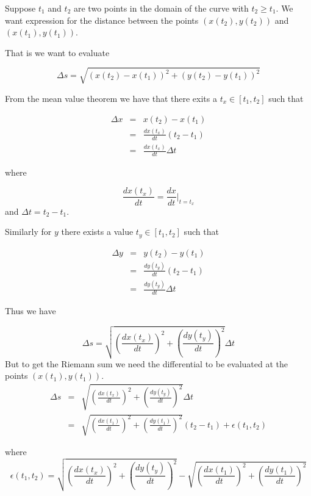 \documentclass[13pt]{article}
\title{}
\author{}
\begin{document}
\maketitle

Suppose $t_1$ and $t_2$ are two points in the domain of the curve with $t_2 \ge t_1$. We want expression for the distance between the points $(x(t_2), y(t_2))$ and $(x(t_1), y(t_1))$.

That is we want to evaluate

\[
	\Delta s = \sqrt{ \left( x(t_2) - x(t_1) \right)^2 + \left( y(t_2) - y(t_1) \right)^2 }
\]

From the mean value theorem we have that there exits a $t_x \in [t_1, t_2]$ such that

\begin{eqnarray*}
	\Delta x &=& x(t_2) - x(t_1) \\
	         &=& \frac{dx(t_x)}{dt}(t_2-t_1) \\
	         &=& \frac{dx(t_x)}{dt} \Delta t
\end{eqnarray*}

where 

\[
\frac{dx(t_x)}{dt} = \frac{dx}{dt}\bigg|_{t=t_x}
\]
and $\Delta t = t_2-t_1$.

Similarly for $y$ there exists a value $t_y \in [t_1, t_2]$ such that 

\begin{eqnarray*}
	\Delta y &=& y(t_2) - y(t_1) \\
	&=& \frac{dy(t_y)}{dt}(t_2-t_1) \\
	&=& \frac{dy(t_y)}{dt} \Delta t
\end{eqnarray*}

Thus we have

\[
	\Delta s = \sqrt{ \left(  \frac{dx(t_x)}{dt} \right)^2 + \left( \frac{dy(t_y)}{dt} \right)^2 } \Delta t
\]
But to get the Riemann sum we need the differential to be evaluated at the points $(x(t_1), y(t_1))$.
\begin{eqnarray*}
\Delta s &=& \sqrt{ \left(  \frac{dx(t_x)}{dt} \right)^2 + \left( \frac{dy(t_y)}{dt} \right)^2 } \Delta t \\
         &=& \sqrt{ \left(  \frac{dx(t_1)}{dt} \right)^2 + \left( \frac{dy(t_1)}{dt} \right)^2 } (t_2-t_1) + \epsilon(t_1, t_2)
\end{eqnarray*}

where 
\[
	\epsilon(t_1, t_2) = \sqrt{ \left(  \frac{dx(t_x)}{dt} \right)^2 + \left( \frac{dy(t_y)}{dt} \right)^2 } - \sqrt{ \left(  \frac{dx(t_1)}{dt} \right)^2 + \left( \frac{dy(t_1)}{dt} \right)^2 }
\]
\end{document}
